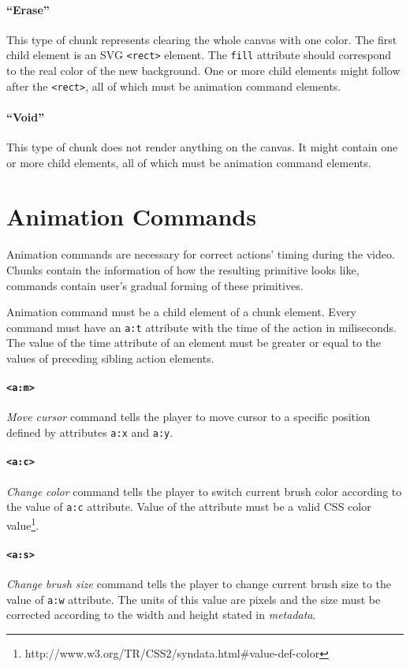 \paragraph{``Erase''}
This type of chunk represents clearing the whole canvas with one color. The first child element is an SVG \verb|<rect>| element. The \verb|fill| attribute should correspond to the real color of the new background. One or more child elements might follow after the \verb|<rect>|, all of which must be animation command elements.

\paragraph{``Void''}
This type of chunk does not render anything on the canvas. It might contain one or more child elements, all of which must be animation command elements.

\section{Animation Commands}
Animation commands are necessary for correct actions' timing during the video. Chunks contain the information of how the resulting primitive looks like, commands contain user's gradual forming of these primitives.

Animation command must be a child element of a chunk element. Every command must have an \verb|a:t| attribute with the time of the action in miliseconds. The value of the time attribute of an element must be greater or equal to the values of preceding sibling action elements.

\paragraph{\texttt{\textless a:m\textgreater}}
\textit{Move cursor} command tells the player to move cursor to a specific position defined by attributes \verb|a:x| and \verb|a:y|.

\paragraph{\texttt{\textless a:c\textgreater}}
\textit{Change color} command tells the player to switch current brush color according to the value of \verb|a:c| attribute. Value of the attribute must be a valid CSS color value\footnote{http://www.w3.org/TR/CSS2/syndata.html\#value-def-color}.

\paragraph{\texttt{\textless a:s\textgreater}}
\textit{Change brush size} command tells the player to change current brush size to the value of \verb|a:w| attribute. The units of this value are pixels and the size must be corrected according to the width and height stated in \textit{metadata}.

